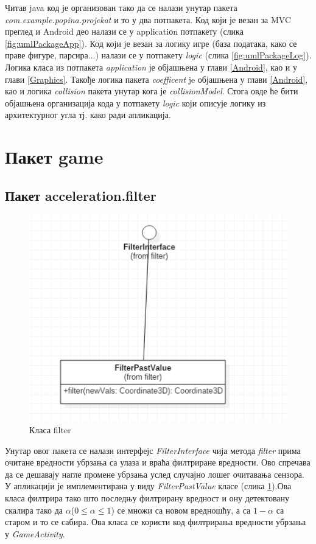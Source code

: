 Читав java код је организован тако да се налази унутар пакета \emph{com.example.popina.projekat} и то у два потпакета. Код који је везан за MVC преглед и Android део налази се у applicatiоn потпакету (слика \ref{fig:umlPackageApp}). Код који је везан за логику игре (база података, како се праве фигуре, парсира...) налази се у потпакету \emph{logic} (слика \ref{fig:umlPackageLog}). Логика класа из потпакета \emph{application} је објашњена у глави \ref{Android}, као и у глави \ref{Graphics}. Такође логика пакета \emph{coefficent} je објашњена у глави  \ref{Android}, као и логика \emph{collision} пакета унутар кога је \emph{collisionModel}. Стога овде ће бити објашњена организација кода у потпакету \emph{logic }који описује логику из архитектурног угла тј. како ради апликација. 

\section{Пакет game}
\subsection{Пакет acceleration.filter}

\begin{figure}[htb!]
\begin{center}
\includegraphics[scale=.6]{pictures/UML/class/filter}
\caption{Класа filter}\label{fig:umlClassFilter}
\end{center}
\end{figure}

Унутар овог пакета се налази интерфејс \emph{FilterInterface} чија метода \emph{filter} прима очитане вредности убрзања са улаза и враћа филтриране вредности. Ово спречава да се дешавају нагле промене убрзања услед случајно лошег очитавања сензора. У апликацији је имплементирана у виду \emph{FilterPastValue} класе (слика \ref{fig:umlClassFilter}).Ова класа филтрира тако што последњу филтрирану вредност и ону детектовану скалира тако да $\alpha$($0 \leq \alpha \leq 1$) се множи са новом вредношћу, а са $1-\alpha$ са старом и то се сабира. Ова класа се користи код филтрирања вредности убрзања у \emph{GameActivity}. 

